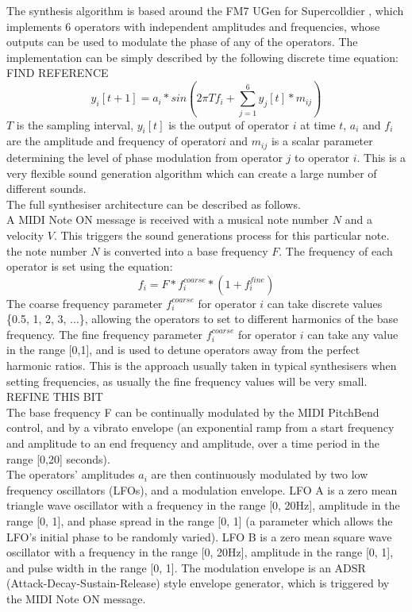 \documentclass[11pt, oneside]{report}   	%
\begin{document}
The synthesis algorithm is based around the FM7 UGen for Supercolldier \cite{UGen}, which implements 6 operators with independent amplitudes and frequencies, whose outputs can be used to modulate the phase of any of the operators. The implementation can be simply described by the following discrete time equation: FIND REFERENCE
\begin{equation}
y_i[t+1] = a_i*sin(2\pi T f_i + \sum_{j = 1}^{6} y_j[t]*m_{ij})
\end{equation}
$T$ is the sampling interval,  $y_i[t]$ is the output of operator $i$ at time $t$, $a_i$ and $f_i$ are the amplitude and frequency of operator$i$ and $m_{ij}$ is a scalar parameter determining the level of phase modulation from operator $j$ to operator $i$. This is a very flexible sound generation algorithm which can create a large number of different sounds. \\
The full synthesiser architecture can be described as follows.\\
 A MIDI Note ON message is received with a musical note number $N$ and a velocity $V$. This triggers the sound generations process for this particular note. the note number $N$ is converted into a base frequency $F$. The frequency of each operator is set using the equation: 
 \begin{equation}
	f_i = F*f_i^{coarse}*(1+f_i^{fine})
 \end{equation}
The coarse frequency parameter $f_i^{coarse}$ for operator $i$ can take discrete values \{0.5, 1, 2, 3, ...\}, allowing the operators to set to different harmonics of the base frequency. The fine frequency parameter $f_i^{coarse}$ for operator $i$ can take any value in the range [0,1], and is used to detune operators away from the perfect harmonic ratios. This is the approach usually taken in typical synthesisers when setting frequencies, as usually the fine frequency values will be very small. REFINE THIS BIT\\
The base frequency F can be continually modulated by the MIDI PitchBend control, and by a vibrato envelope (an exponential ramp from a start frequency and amplitude to an end frequency and amplitude, over a time period in the range [0,20] seconds).\\
The operators' amplitudes $a_i$ are then continuously modulated by two low frequency oscillators (LFOs), and a modulation envelope. LFO A is a zero mean triangle wave oscillator with a frequency in the range [0, 20\si{\hertz}], amplitude in the range [0, 1], and phase spread in the range [0, 1] (a parameter which allows the LFO's initial phase to be randomly varied). LFO B is a zero mean square wave oscillator with a frequency in the range [0, 20\si{\hertz}], amplitude in the range [0, 1], and pulse width in the range [0, 1]. The modulation envelope is an ADSR (Attack-Decay-Sustain-Release) style envelope generator, which is triggered by the MIDI Note ON message.
\end{document}
